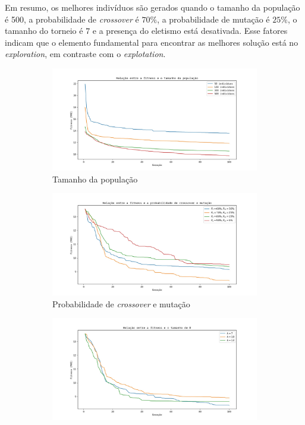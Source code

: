 \documentclass[a4paper]{article}
\begin{document}
Em resumo, os melhores indivíduos são gerados quando o tamanho da população é
500, a probabilidade de \textit{crossover} é $70\%$, a probabilidade de mutação
é $25\%$, o tamanho do torneio é $7$ e a presença do eletismo está
desativada. Esse fatores indicam que o elemento fundamental para encontrar as
melhores solução está no \textit{exploration}, em contraste com o
\textit{explotation}.
 
\begin{figure}[h]
  \caption{Resultados da \textit{fitness}}
  \label{fig:concrete_fitness}
  \begin{subfigure}[t]{0.5\textwidth}
      \includegraphics[width=\textwidth]{concrete_pop_sz_e}
      \caption{Tamanho da população}
      \label{fig:concrete_pop_sz_e}
    \end{subfigure}
    \begin{subfigure}[t]{0.5\textwidth}
      \includegraphics[width=\textwidth]{concrete_pc_pm_e}
      \caption{Probabilidade de \textit{crossover} e mutação}
      \label{fig:concrete_pc_pm_e}
    \end{subfigure}
    \begin{subfigure}[t]{0.5\textwidth}
      \includegraphics[width=\textwidth]{concrete_k_e}

\end{subfigure}
\end{figure}
\end{document}
